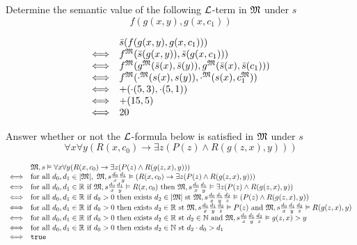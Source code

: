 \documentclass[11pt,a4paper]{article}
\begin{document}
\qpartnb Determine the semantic value of the following $\mathcal{L}$-term in $\mathfrak{M}$ under $s$
$$f(g(x,y),g(x,c_1))$$

\apart
\[\begin{array}{rl}
&\bar{s}(f(g(x,y),g(x,c_1)))\\
\Longleftrightarrow&f^{\mathfrak{M}}(\bar{s}(g(x,y)),\bar{s}(g(x,c_1)))\\
\Longleftrightarrow&f^{\mathfrak{M}}(g^{\mathfrak{M}}(\bar{s}(x),\bar{s}(y)),g^{\mathfrak{M}}(\bar{s}(x),\bar{s}(c_1)))\\
\Longleftrightarrow&f^{\mathfrak{M}}(\cdot^{\mathfrak{M}}(s(x),s(y)),\cdot^{\mathfrak{M}}(s(x),c_1^{\mathfrak{M}}))\\
\Longleftrightarrow&+(\cdot(5,3),\cdot(5,1))\\
\Longleftrightarrow&+(15,5)\\
\Longleftrightarrow&20
\end{array}\]

\qpartnb Answer whether or not the $\mathcal{L}$-formula below is satisfied in $\mathfrak{M}$ under $s$
$$\forall x\forall y(R(x,c_0)\to\exists z(P(z)\wedge R(g(z,x),y)))$$

\apart
\[\begin{array}{rl}
&\M,s\vDash\forall x\forall y(R(x,c_0)\to\exists z(P(z)\wedge R(g(z,x),y)))\\
\Longleftrightarrow&\text{for all }d_0,d_1\in|\M|,\ \M,s\frac{d_0}{x}\frac{d_1}{y}\vDash(R(x,c_0)\to\exists z(P(z)\wedge R(g(z,x),y)))\\
\Longleftrightarrow&\text{for all }d_0,d_1\in\reals\text{ if }\M,s\frac{d_0}{x}\frac{d_1}{y}\vDash R(x,c_0)\text{ then }\M,s\frac{d_0}{x}\frac{d_1}{y}\vDash\exists z(P(z)\wedge R(g(z,x),y))\\
\Longleftrightarrow&\text{for all }d_0,d_1\in\reals\text{ if }d_0>0\text{ then exists }d_2\in|\M|\text{ st }\M,s\frac{d_0}{x}\frac{d_1}{y}\frac{d_2}{z}\vDash (P(z)\wedge R(g(z,x),y))\\
\Longleftrightarrow&\text{for all }d_0,d_1\in\reals\text{ if }d_0>0\text{ then exists }d_2\in\reals\text{ st }\M,s\frac{d_0}{x}\frac{d_1}{y}\frac{d_2}{z}\vDash P(z)\text{ and }\M,s\frac{d_0}{x}\frac{d_1}{y}\frac{d_2}{z}\vDash R(g(z,x),y)\\
\Longleftrightarrow&\text{for all }d_0,d_1\in\reals\text{ if }d_0>0\text{ then exists }d_2\in\reals\text{ st }d_2\in\nats\text{ and }\M,s\frac{d_0}{x}\frac{d_1}{y}\frac{d_2}{z}\vDash g(z,x)>y\\
\Longleftrightarrow&\text{for all }d_0,d_1\in\reals\text{ if }d_0>0\text{ then exists }d_2\in\nats\text{ st }d_2\cdot d_0>d_1\\
\Longleftrightarrow&\mathtt{true}
\end{array}\]
\end{document}
